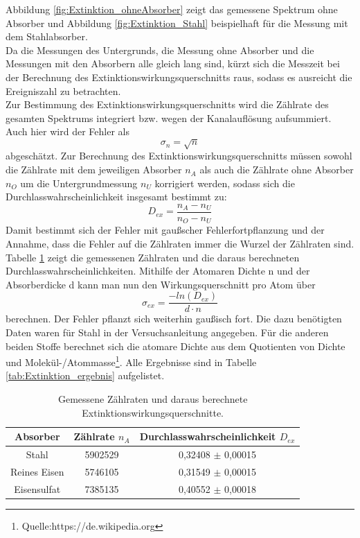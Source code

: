 \documentclass[12pt,a4paper]{article}
\begin{document}
Abbildung \ref{fig:Extinktion_ohneAbsorber} zeigt das gemessene Spektrum ohne Absorber und Abbildung \ref{fig:Extinktion_Stahl} beispielhaft für die Messung mit dem Stahlabsorber. \\
Da die Messungen des Untergrunds, die Messung ohne Absorber und die Messungen mit den Absorbern alle gleich lang sind, kürzt sich die Messzeit bei der Berechnung des Extinktionswirkungsquerschnitts raus, sodass es ausreicht die Ereigniszahl zu betrachten.\\ 
Zur Bestimmung des Extinktionswirkungsquerschnitts wird die Zählrate des gesamten Spektrums integriert bzw. wegen der Kanalauflösung aufsummiert. Auch hier wird der Fehler als 
\begin{equation*}
\sigma _{n} = \sqrt{n}
\end{equation*}
abgeschätzt. Zur Berechnung des Extinktionswirkungsquerschnitts müssen sowohl die Zählrate mit dem jeweiligen Absorber $n_A$ als auch die Zählrate ohne Absorber $n_O$ um die Untergrundmessung $n_U$ korrigiert werden, sodass sich die Durchlasswahrscheinlichkeit insgesamt bestimmt zu:
\begin{equation*}
D_{ex} = \dfrac{n_A - n_U}{n_O - n_U}
\end{equation*}
Damit bestimmt sich der Fehler mit gaußscher Fehlerfortpflanzung und der Annahme, dass die Fehler auf die Zählraten immer die Wurzel der Zählraten sind.
Tabelle \ref{tab:Extinktion_wirkungsquerschnitt} zeigt die gemessenen Zählraten und die daraus berechneten Durchlasswahrscheinlichkeiten. Mithilfe der Atomaren Dichte n und der Absorberdicke d kann man nun den Wirkungsquerschnitt pro Atom über \begin{equation}
\sigma_{ex} = \dfrac{-ln(D_{ex})}{d\cdot n}
\end{equation}
berechnen. Der Fehler pflanzt sich weiterhin gaußisch fort. Die dazu benötigten Daten waren für Stahl in der Versuchsanleitung angegeben. Für die anderen beiden Stoffe berechnet sich die atomare Dichte aus dem Quotienten von Dichte und Molekül-/Atommasse\footnote{Quelle:https://de.wikipedia.org}. Alle Ergebnisse sind in Tabelle \ref{tab:Extinktion_ergebnis} aufgelistet.\\

\begin{table}
\centering
\begin{tabular}{|c|c|c|}
\hline 
Absorber & Zählrate $n_A$ & Durchlasswahrscheinlichkeit $D_{ex}$ \\ 
\hline 
Stahl & 5902529 & 0,32408 $\pm$ 0,00015 \\
\hline 
Reines Eisen & 5746105 & 0,31549 $\pm$ 0,00015 \\
\hline
Eisensulfat & 7385135 & 0,40552 $\pm$ 0,00018 \\
\hline
\end{tabular} 
\caption{Gemessene Zählraten und daraus berechnete Extinktionswirkungsquerschnitte.}
\label{tab:Extinktion_wirkungsquerschnitt}
\end{table}
\end{document}
